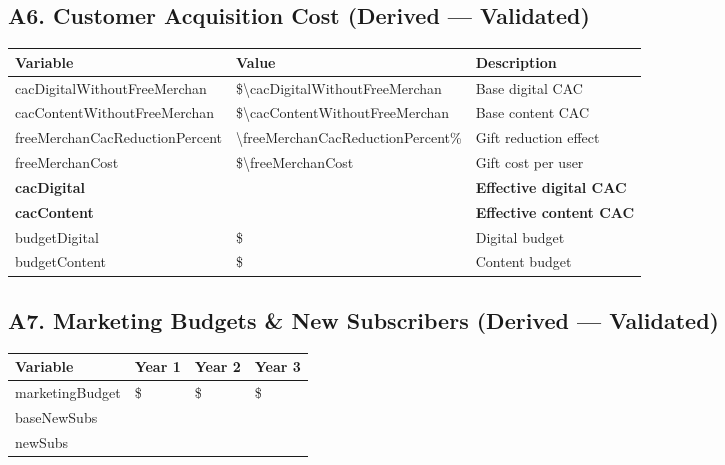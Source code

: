 \subsection*{A6. Customer Acquisition Cost (Derived --- Validated)}
\begin{tabularx}{\linewidth}{l Y X}
\toprule
\textbf{Variable} & \textbf{Value} & \textbf{Description} \\\midrule
cacDigitalWithoutFreeMerchan & \$\num{\cacDigitalWithoutFreeMerchan} & Base digital CAC \\
cacContentWithoutFreeMerchan & \$\num{\cacContentWithoutFreeMerchan} & Base content CAC \\
freeMerchanCacReductionPercent & \num{\freeMerchanCacReductionPercent}\% & Gift reduction effect \\
freeMerchanCost & \$\num{\freeMerchanCost} & Gift cost per user \\
\textbf{cacDigital} & \validate{\cacDigital}{\HCcacDigital} & \textbf{Effective digital CAC} \\
\textbf{cacContent} & \validate{\cacContent}{\HCcacContent} & \textbf{Effective content CAC} \\
budgetDigital & \$\numint{\budgetDigital} & Digital budget \\
budgetContent & \$\numint{\budgetContent} & Content budget \\
\bottomrule
\end{tabularx}

\subsection*{A7. Marketing Budgets \& New Subscribers (Derived --- Validated)}
\begin{tabularx}{\linewidth}{l Y Y Y}
\toprule
\textbf{Variable} & \textbf{Year 1} & \textbf{Year 2} & \textbf{Year 3} \\\midrule
marketingBudget & \$\numint{\marketingBudgetYearOne} & \$\numint{\marketingBudgetYearTwo} & \$\numint{\marketingBudgetYearThree} \\
baseNewSubs & \validateint{\baseNewSubsYearOne}{\HCbaseNewSubsYearOne} & \validateint{\baseNewSubsYearTwo}{\HCbaseNewSubsYearTwo} & \validateint{\baseNewSubsYearThree}{\HCbaseNewSubsYearThree} \\
newSubs & \validateint{\newSubsYearOne}{\HCbaseNewSubsYearOne} & \validateint{\newSubsYearTwo}{\HCbaseNewSubsYearTwo} & \validateint{\newSubsYearThree}{\HCbaseNewSubsYearThree} \\
\bottomrule
\end{tabularx}

